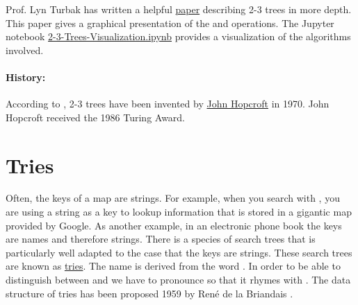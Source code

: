 Prof. Lyn Turbak has written a helpful
\href{http://www.cs.princeton.edu/~dpw/courses/cos326-12/ass/2-3-trees.pdf}{paper} describing 2-3 trees in more
depth.  This paper gives a graphical presentation of the  and  operations.
The Jupyter notebook
\href{https://github.com/karlstroetmann/Algorithms/blob/master/Python/Chapter-08/2-3-Trees-Visualization.ipynb}{2-3-Trees-Visualization.ipynb}
provides a visualization of the algorithms involved.

\paragraph{History:}
According to \cite{cormen:09}, 2-3 trees have been invented by
\href{https://en.wikipedia.org/wiki/John_Hopcroft}{John Hopcroft} in 1970.  John Hopcroft received the 1986
Turing Award. 



\section{Tries}
Often, the keys of a map are strings.  For example, when you search with 
\href{https://www.google.com}{}, you are using
a string as a key to lookup information that is stored in a gigantic map provided by Google.
As another example, in an electronic phone book the keys are names and therefore strings.  
There is a species of search trees that is particularly well adapted to the case that the keys are
strings.  These search trees are known as \href{https://en.wikipedia.org/?title=Trie}{tries}.  
The name is derived from the word
.  In order to be able to distinguish between  and
 we have to pronounce    so that it rhymes with .   The data
structure of tries has been proposed 1959 by Ren\'e de la Briandais \cite{briandais:59}.

